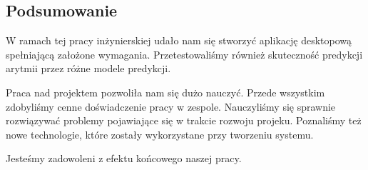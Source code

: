 \documentclass[polish,12pt]{aghthesis}
\begin{document}
\subsection{Podsumowanie}

W ramach tej pracy inżynierskiej udało nam się stworzyć aplikację desktopową spełniającą założone wymagania. Przetestowaliśmy również skuteczność predykcji arytmii przez różne modele predykcji.

Praca nad projektem pozwoliła nam się dużo nauczyć. Przede wszystkim zdobyliśmy cenne doświadczenie pracy w zespole. Nauczyliśmy się sprawnie rozwiązywać problemy pojawiające się w trakcie rozwoju projeku. Poznaliśmy też nowe technologie, które zostały wykorzystane przy tworzeniu systemu.

Jesteśmy zadowoleni z efektu końcowego naszej pracy.



\nocite{*}


\end{document}
